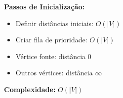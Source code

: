 \documentclass[preview]{standalone}
\begin{document}
\begin{center}
\textbf{Passos de Inicialização:}
            \begin{itemize}
                \item Definir distâncias iniciais: $O(|V|)$
                \item Criar fila de prioridade: $O(|V|)$
                \item Vértice fonte: distância $0$
                \item Outros vértices: distância $\infty$
            \end{itemize}
            
            \textbf{Complexidade:} $O(|V|)$
\end{center}
\end{document}
